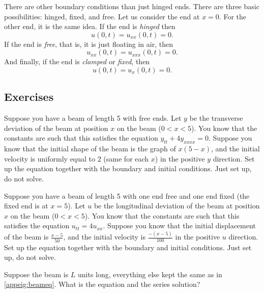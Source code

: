 There are other boundary conditions than just hinged ends.  There are
three basic possibilities: hinged, fixed, and free.  Let us consider
the end at $x=0$.  For the other end, it is the same idea.
If the end is \emph{hinged} then
\begin{equation*}
u(0,t) = u_{xx}(0,t) = 0 .
\end{equation*}
If the end is \emph{free}, that is, it is just
floating in air, then
\begin{equation*}
u_{xx}(0,t) = u_{xxx}(0,t) = 0 .
\end{equation*}
And finally, if the end is
\emph{clamped}
or  
\emph{fixed},
then
\begin{equation*}
u(0,t) = u_{x}(0,t) = 0 .
\end{equation*}


\subsection{Exercises}

\begin{exercise}
Suppose you have a beam of length 5 with free ends.  Let $y$ be the
transverse deviation of the beam at position $x$ on the beam ($0 < x < 5$).
You know that the
constants are such that this satisfies the equation $y_{tt} + 4 y_{xxxx} =
0$.   Suppose you know that the initial shape of the beam is the graph of
$x(5-x)$, and the initial velocity is uniformly equal to 2 (same for each $x$)
in the positive $y$ direction.  Set up the equation together with the
boundary and initial conditions.  Just set up, do not solve.
\end{exercise}

\begin{exercise}
Suppose you have a beam of length 5 with one end free and one end fixed
(the fixed end is at $x=5$).
Let $u$ be the
longitudinal deviation of the beam at position $x$ on the beam ($0 < x < 5$).
You know that the
constants are such that this satisfies the equation $u_{tt} = 4 u_{xx}$.
Suppose you know that the initial displacement of the beam
is $\frac{x-5}{50}$, and the initial velocity is $\frac{-(x-5)}{100}$
in the positive $u$ direction.  Set up the equation together with the
boundary and initial conditions.  Just set up, do not solve.
\end{exercise}

\begin{exercise}
Suppose the beam is $L$ units long, everything else kept the same
as in \eqref{appeig:beameq}.  What is the equation and the series
solution?
\end{exercise}

